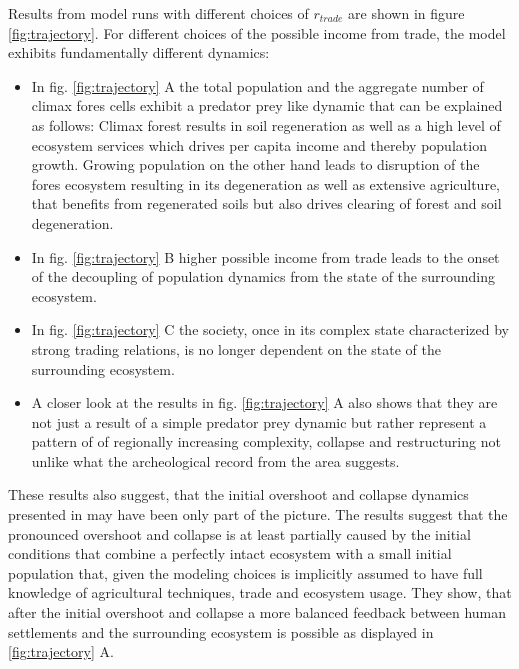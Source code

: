 Results from model runs with different choices of $r_{trade}$ are shown in figure \ref{fig:trajectory}. For different choices of the possible income from trade, the model exhibits fundamentally different dynamics:
\begin{itemize}
  \item In fig. \ref{fig:trajectory} A the total population and the aggregate number of climax fores cells exhibit a predator prey like dynamic that can be explained as follows: Climax forest results in soil regeneration as well as a high level of ecosystem services which drives per capita income and thereby population growth. Growing population on the other hand leads to disruption of the fores ecosystem resulting in its degeneration as well as extensive agriculture, that benefits from regenerated soils but also drives clearing of forest and soil degeneration.
  \item In fig. \ref{fig:trajectory} B higher possible income from trade leads to the onset of the decoupling of population dynamics from the state of the surrounding ecosystem. 
  \item In fig. \ref{fig:trajectory} C the society, once in its complex state characterized by strong trading relations, is no longer dependent on the state of the surrounding ecosystem.
  \item A closer look at the results in fig. \ref{fig:trajectory} A also shows that they are not just a result of a simple predator prey dynamic but rather represent a pattern of of regionally increasing complexity, collapse and restructuring not unlike what the archeological record from the area suggests.
\end{itemize}
These results also suggest, that the initial overshoot and collapse dynamics presented in \cite{Heckbert2013} may have been only part of the picture. The results suggest that the pronounced overshoot and collapse is at least partially caused by the initial conditions that combine a perfectly intact ecosystem with a small initial population that, given the modeling choices is implicitly assumed to have full knowledge of agricultural techniques, trade and ecosystem usage. They show, that after the initial overshoot and collapse a more balanced feedback between human settlements and the surrounding ecosystem is possible as displayed in \ref{fig:trajectory} A.

